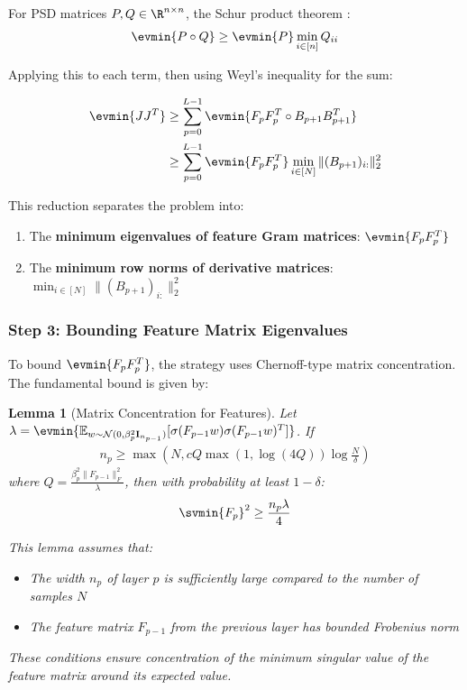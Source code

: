 \documentclass[a4paper]{article}
\newcommand{\E}{\mathbb{E}}
\theoremstyle{plain}
\newtheorem{lemma}[theorem]{Lemma}
\theoremstyle{definition}
\theoremstyle{remark}
\begin{document}
For PSD matrices $P, Q \in \R^{n \times n}$, the Schur product theorem :
\begin{align}
\evmin{P \circ Q} \geq \evmin{P} \min_{i \in [n]} Q_{ii}
\end{align}

Applying this to each term, then using Weyl's inequality for the sum:

\begin{align}
\evmin{JJ^T} &\geq \sum_{p=0}^{L-1} \evmin{F_p F_p^T \circ B_{p+1} B_{p+1}^T} \\
&\geq \sum_{p=0}^{L-1} \evmin{F_p F_p^T} \min_{i \in [N]} \|(B_{p+1})_{i:}\|_2^2
\end{align}

This reduction separates the problem into:
\begin{enumerate}
    \item The \textbf{minimum eigenvalues of feature Gram matrices}: $\evmin{F_p F_p^T}$
    \item The \textbf{minimum row norms of derivative matrices}: $\min_{i \in [N]} \|(B_{p+1})_{i:}\|_2^2$
\end{enumerate}

\subsubsection{Step 3: Bounding Feature Matrix Eigenvalues}

To bound $\evmin{F_p F_p^T}$, the strategy uses Chernoff-type matrix concentration. The fundamental bound is given by:
\begin{lemma}[Matrix Concentration for Features]
Let $\lambda = \evmin{\E_{w \sim \mathcal{N}(0, \beta_p^2 \mathbf{I}_{n_{p-1}})}[\sigma(F_{p-1}w)\sigma(F_{p-1}w)^T]}$. If 
\begin{align}
n_p \geq \max\left(N, c Q \max(1, \log(4Q)) \log\frac{N}{\delta}\right)
\end{align}
where $Q = \frac{\beta_p^2 \|F_{p-1}\|_F^2}{\lambda}$, then with probability at least $1-\delta$:
\begin{align}
\svmin{F_p}^2 \geq \frac{n_p \lambda}{4}
\end{align}

This lemma assumes that:
\begin{itemize}
\item The width $n_p$ of layer $p$ is sufficiently large compared to the number of samples $N$
\item The feature matrix $F_{p-1}$ from the previous layer has bounded Frobenius norm
\end{itemize}
These conditions ensure concentration of the minimum singular value of the feature matrix around its expected value.
\end{lemma}
\end{document}
